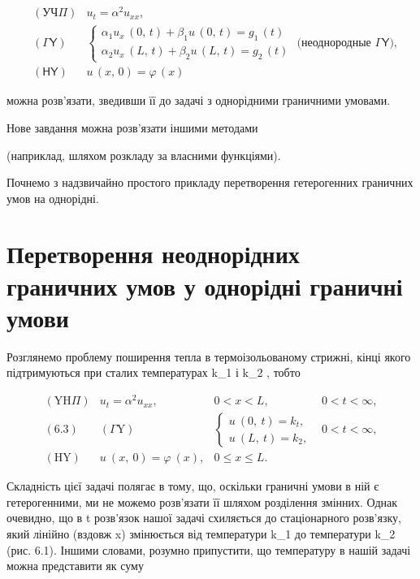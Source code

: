 \documentclass[
  ukrainian,
]{article}
\begin{document}
\[
\begin{aligned} & (\mathsf{У}\mathsf{Ч}\Pi) & u_t = \alpha^2 u_{xx}, \\ & (\mathsf{\Gamma}\mathsf{Y}) & \begin{cases} \alpha_1 u_x \, (0, \, t) + \beta_1 u \, (0, \, t) = g_1 \, (t) \\ \alpha_2 u_x \, (L, \, t) + \beta_2 u \, (L, \, t) = g_2 \, (t) \end{cases} \text{ (неоднородные } \mathsf{\Gamma}\mathsf{Y}), \\ & (\mathsf{H}\mathsf{Y}) & u \, (x, \, 0) = \varphi \, (x) \end{aligned}
\]

можна розв'язати, зведивши її до задачі з однорідними граничними
умовами.

Нове завдання можна розв'язати іншими методами

(наприклад, шляхом розкладу за власними функціями).

Почнемо з надзвичайно простого прикладу перетворення гетерогенних
граничних умов на однорідні.

\section{Перетворення неоднорідних граничних умов у однорідні граничні
умови}\label{ux43fux435ux440ux435ux442ux432ux43eux440ux435ux43dux43dux44f-ux43dux435ux43eux434ux43dux43eux440ux456ux434ux43dux438ux445-ux433ux440ux430ux43dux438ux447ux43dux438ux445-ux443ux43cux43eux432-ux443-ux43eux434ux43dux43eux440ux456ux434ux43dux456-ux433ux440ux430ux43dux438ux447ux43dux456-ux443ux43cux43eux432ux438}

Розглянемо проблему поширення тепла в термоізольованому стрижні, кінці
якого підтримуються при сталих температурах k\_1 і k\_2 , тобто

\[
\begin{aligned} (\mathrm{Y}\mathrm{H}\Pi) & u_t = \alpha^2 u_{xx}, & 0 < x < L, & 0 < t < \infty, \\ (6.3) & (\Gamma\mathrm{Y}) & \begin{cases} u \ (0, \ t) = k_t, \\ u \ (L, \ t) = k_2, \end{cases} & 0 < t < \infty, \\ (\mathrm{H}\mathrm{Y}) & u \ (x, \ 0) = \varphi \ (x), & 0 \leqslant x \leqslant L. \end{aligned}
\]

Складність цієї задачі полягає в тому, що, оскільки граничні умови в ній
є гетерогенними, ми не можемо розв'язати її шляхом розділення змінних.
Однак очевидно, що в t \to \infty розв'язок нашої задачі схиляється до
стаціонарного розв'язку, який лінійно (вздовж x) змінюється від
температури k\_1 до температури k\_2 (рис. 6.1). Іншими словами, розумно
припустити, що температуру в нашій задачі можна представити як суму
\end{document}
